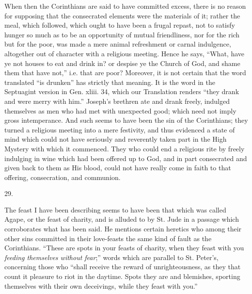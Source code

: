 When then the Corinthians are said to have
committed excess, there is no reason for supposing that the
consecrated elements were the materials of it; rather the meal, which
followed, which ought to have been a frugal repast, not to satisfy
hunger so much as to be an opportunity of mutual friendliness, nor for
the rich but for the poor, was made a mere animal refreshment or
carnal indulgence, altogether out of character with a religious
meeting. Hence he says, ``What, have ye not houses to eat and drink in?
or despise ye the Church of God, and shame them that have not,'' i.e.
that are poor? Moreover, it is not certain that the word translated ``is
drunken'' has strictly that meaning. It is the word in the Septuagint
version in Gen. xliii. 34, which our Translation renders ``they drank
and were merry with him.'' Joseph's brethren ate and drank freely,
indulged themselves as men who had met with unexpected good; which
need not imply gross intemperance. And such seems to have been the sin
of the Corinthians; they turned a religious meeting into a mere
festivity, and thus evidenced a state of mind which could not have
seriously and reverently taken part in the High Mystery with which it
commenced. They who could end a religious rite by freely indulging in
wine which had been offered up to God, and in part consecrated and given back to them as His blood, could not have really come in
faith to that offering, consecration, and communion.

29.

The feast I have been describing seems to have
been that which was called Agape, or the feast of charity, and is
alluded to by St. Jude in a passage which corroborates what has been
said. He mentions certain heretics who among their other sins
committed in their love-feasts the same kind of fault as the
Corinthians. ``These are spots in your feasts of charity, when they
feast with you \emph{feeding themselves without fear};'' words which
are parallel to St. Peter's, concerning those who ``shall receive the
reward of unrighteousness, as they that count it pleasure to riot in
the daytime. Spots they are and blemishes, sporting themselves with
their own deceivings, while they feast with you.''

